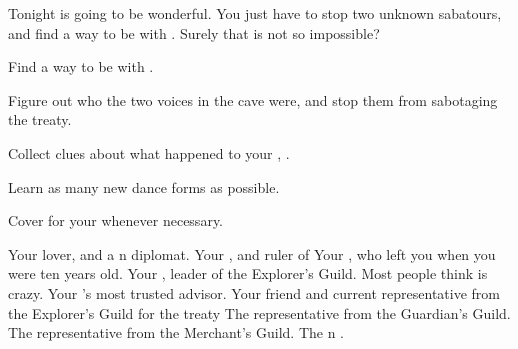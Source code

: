 \documentclass[char]{NeptuneBall}
\begin{document}
Tonight is going to be wonderful. You just have to stop two unknown sabatours, and find a way to be with \cDiplomat{}. Surely that is not so impossible?

\begin{itemz}[Goals]
  \item Find a way to be with \cDiplomat{}.
  \item Figure out who the two voices in the cave were, and stop them from sabotaging the treaty.
  \item Collect clues about what happened to your \cQueen{\parent}, \cQueen{\King} \cQueen{}.
  \item Learn as many new dance forms as possible.
  \item Cover for your \cKing{\parent} whenever necessary.
\end{itemz}

\begin{contacts}
  \contact{\cDiplomat{}} Your lover, and a \pPacifica{}n diplomat.
  \contact{\cKing{}} Your \cKing{\parent}, and ruler of \pAtlantis{}
  \contact{\cAriel{}} Your \cAriel{\sibling}, who left you when you were ten years old.
  \contact{\cPlant{}} Your \cPlant{\uncle}, leader of the Explorer's Guild. Most people think  is crazy.
  \contact{\cManta{}} Your \cKing{\parent}'s most trusted advisor.
  \contact{\cPriest{}} Your friend and current representative from the Explorer's Guild for the treaty
  \contact{\cGeneral{}} The representative from the Guardian's Guild.
  \contact{\cSlave{}} The representative from the Merchant's Guild.
  \contact{\cPrince{}} The \pPacifica{}n \cPrince{\prince}.
\end{contacts}
\end{document}
